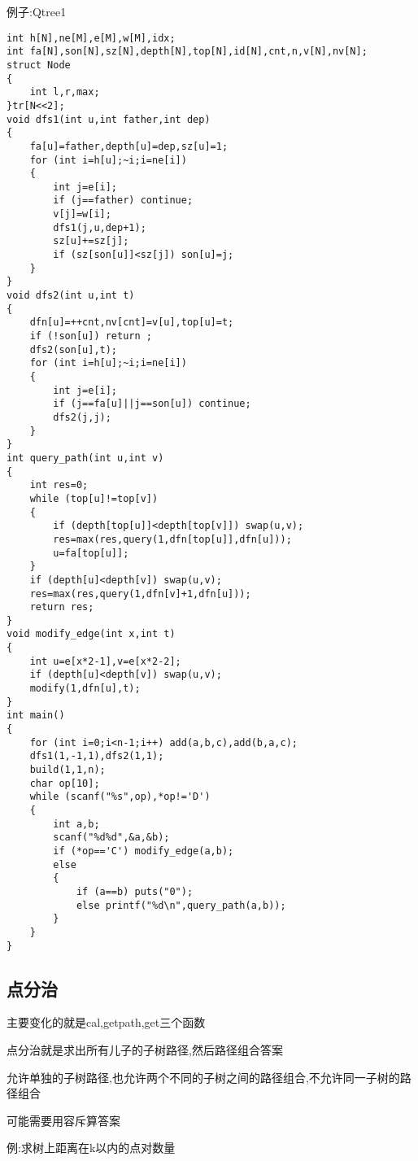 \documentclass[a4paper]{ctexart}
\begin{document}
例子:Qtree1

\begin{lstlisting}
int h[N],ne[M],e[M],w[M],idx;
int fa[N],son[N],sz[N],depth[N],top[N],id[N],cnt,n,v[N],nv[N];
struct Node
{
	int l,r,max;
}tr[N<<2];
void dfs1(int u,int father,int dep)
{
	fa[u]=father,depth[u]=dep,sz[u]=1;
	for (int i=h[u];~i;i=ne[i])
	{
		int j=e[i];
		if (j==father) continue;
		v[j]=w[i];
		dfs1(j,u,dep+1);
		sz[u]+=sz[j];
		if (sz[son[u]]<sz[j]) son[u]=j;
	}
}
void dfs2(int u,int t)
{
	dfn[u]=++cnt,nv[cnt]=v[u],top[u]=t;
	if (!son[u]) return ;
	dfs2(son[u],t);
	for (int i=h[u];~i;i=ne[i])
	{
		int j=e[i];
		if (j==fa[u]||j==son[u]) continue;
		dfs2(j,j);
	}
}
int query_path(int u,int v)
{
	int res=0;
	while (top[u]!=top[v])
	{
		if (depth[top[u]]<depth[top[v]]) swap(u,v);
		res=max(res,query(1,dfn[top[u]],dfn[u]));
		u=fa[top[u]];
	}
	if (depth[u]<depth[v]) swap(u,v);
	res=max(res,query(1,dfn[v]+1,dfn[u]));
	return res;
}
void modify_edge(int x,int t)
{
	int u=e[x*2-1],v=e[x*2-2];
	if (depth[u]<depth[v]) swap(u,v);
	modify(1,dfn[u],t);
}
int main()
{
	for (int i=0;i<n-1;i++) add(a,b,c),add(b,a,c);
	dfs1(1,-1,1),dfs2(1,1);
	build(1,1,n);
	char op[10];
	while (scanf("%s",op),*op!='D')
	{
		int a,b;
		scanf("%d%d",&a,&b);
		if (*op=='C') modify_edge(a,b);
		else
		{
			if (a==b) puts("0");
			else printf("%d\n",query_path(a,b));
		}
	}
}
\end{lstlisting}

\subsection{点分治}
主要变化的就是cal,getpath,get三个函数

点分治就是求出所有儿子的子树路径,然后路径组合答案

允许单独的子树路径,也允许两个不同的子树之间的路径组合,不允许同一子树的路径组合

可能需要用容斥算答案

例:求树上距离在k以内的点对数量
\end{document}
